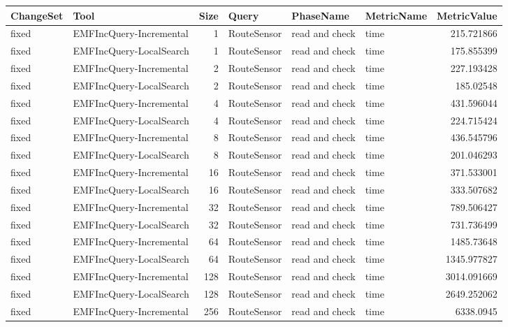 \begin{table}
\centering
\footnotesize
\begin{tabular}{| l | l | r | l | l | l | r |}
\hline
\sf ChangeSet & \sf Tool & \sf Size & \sf Query & \sf PhaseName & \sf MetricName & \sf MetricValue\\\hline

fixed & EMFIncQuery-Incremental & 1 & RouteSensor & read and check & time & 215.721866\\\hline
fixed & EMFIncQuery-LocalSearch & 1 & RouteSensor & read and check & time & 175.855399\\\hline
fixed & EMFIncQuery-Incremental & 2 & RouteSensor & read and check & time & 227.193428\\\hline
fixed & EMFIncQuery-LocalSearch & 2 & RouteSensor & read and check & time & 185.02548\\\hline
fixed & EMFIncQuery-Incremental & 4 & RouteSensor & read and check & time & 431.596044\\\hline
fixed & EMFIncQuery-LocalSearch & 4 & RouteSensor & read and check & time & 224.715424\\\hline
fixed & EMFIncQuery-Incremental & 8 & RouteSensor & read and check & time & 436.545796\\\hline
fixed & EMFIncQuery-LocalSearch & 8 & RouteSensor & read and check & time & 201.046293\\\hline
fixed & EMFIncQuery-Incremental & 16 & RouteSensor & read and check & time & 371.533001\\\hline
fixed & EMFIncQuery-LocalSearch & 16 & RouteSensor & read and check & time & 333.507682\\\hline
fixed & EMFIncQuery-Incremental & 32 & RouteSensor & read and check & time & 789.506427\\\hline
fixed & EMFIncQuery-LocalSearch & 32 & RouteSensor & read and check & time & 731.736499\\\hline
fixed & EMFIncQuery-Incremental & 64 & RouteSensor & read and check & time & 1485.73648\\\hline
fixed & EMFIncQuery-LocalSearch & 64 & RouteSensor & read and check & time & 1345.977827\\\hline
fixed & EMFIncQuery-Incremental & 128 & RouteSensor & read and check & time & 3014.091669\\\hline
fixed & EMFIncQuery-LocalSearch & 128 & RouteSensor & read and check & time & 2649.252062\\\hline
fixed & EMFIncQuery-Incremental & 256 & RouteSensor & read and check & time & 6338.0945\\\hline

\end{tabular}
\end{table}
